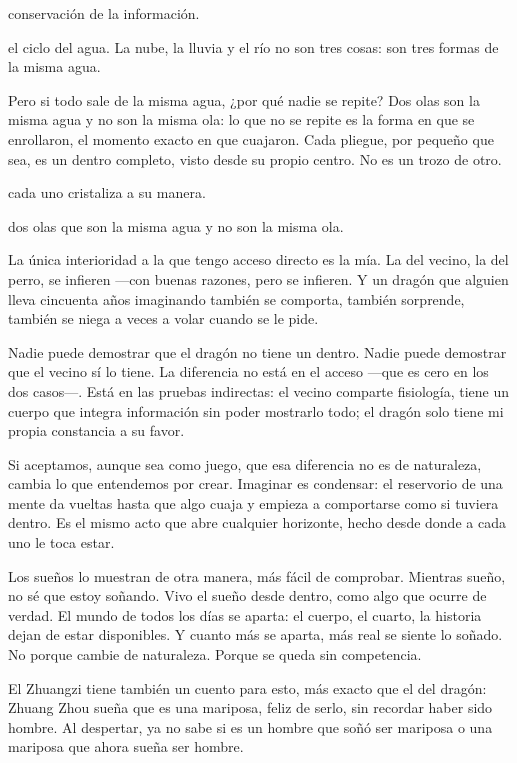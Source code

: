 \begin{fisica}
 conservación de la información.

 el ciclo del agua. La nube, la lluvia y el río no son tres cosas: son tres formas de la misma agua.
\end{fisica}
Pero si todo sale de la misma agua, ¿por qué nadie se repite? Dos olas son la misma agua y no son la misma ola: lo que no se repite es la forma en que se enrollaron, el momento exacto en que cuajaron. Cada pliegue, por pequeño que sea, es un dentro completo, visto desde su propio centro. No es un trozo de otro.

\begin{fisica}
 cada uno cristaliza a su manera.

 dos olas que son la misma agua y no son la misma ola.
\end{fisica}
\noindent La única interioridad a la que tengo acceso directo es la mía. La del vecino, la del perro, se infieren —con buenas razones, pero se infieren. Y un dragón que alguien lleva cincuenta años imaginando también se comporta, también sorprende, también se niega a veces a volar cuando se le pide.

Nadie puede demostrar que el dragón no tiene un dentro. Nadie puede demostrar que el vecino sí lo tiene. La diferencia no está en el acceso —que es cero en los dos casos—. Está en las pruebas indirectas: el vecino comparte fisiología, tiene un cuerpo que integra información sin poder mostrarlo todo; el dragón solo tiene mi propia constancia a su favor.

Si aceptamos, aunque sea como juego, que esa diferencia no es de naturaleza, cambia lo que entendemos por crear. Imaginar es condensar: el reservorio de una mente da vueltas hasta que algo cuaja y empieza a comportarse como si tuviera dentro. Es el mismo acto que abre cualquier horizonte, hecho desde donde a cada uno le toca estar.

Los sueños lo muestran de otra manera, más fácil de comprobar. Mientras sueño, no sé que estoy soñando. Vivo el sueño desde dentro, como algo que ocurre de verdad. El mundo de todos los días se aparta: el cuerpo, el cuarto, la historia dejan de estar disponibles. Y cuanto más se aparta, más real se siente lo soñado. No porque cambie de naturaleza. Porque se queda sin competencia.

El Zhuangzi tiene también un cuento para esto, más exacto que el del dragón: Zhuang Zhou sueña que es una mariposa, feliz de serlo, sin recordar haber sido hombre. Al despertar, ya no sabe si es un hombre que soñó ser mariposa o una mariposa que ahora sueña ser hombre.

